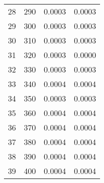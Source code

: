 \begin{table}
\begin{adjustbox}{width=1\textwidth/2}
\begin{tabular}{|c|c|c|c|}
\cline{1-4}
28 & 290 & 0.0003 & 0.0003 \\
\cline{1-4}
29 & 300 & 0.0003 & 0.0003 \\
\cline{1-4}
30 & 310 & 0.0003 & 0.0003 \\
\cline{1-4}
31 & 320 & 0.0003 & 0.0000 \\
\cline{1-4}
32 & 330 & 0.0003 & 0.0003 \\
\cline{1-4}
33 & 340 & 0.0004 & 0.0004 \\
\cline{1-4}
34 & 350 & 0.0003 & 0.0003 \\
\cline{1-4}
35 & 360 & 0.0004 & 0.0004 \\
\cline{1-4}
36 & 370 & 0.0004 & 0.0004 \\
\cline{1-4}
37 & 380 & 0.0004 & 0.0004 \\
\cline{1-4}
38 & 390 & 0.0004 & 0.0004 \\
\cline{1-4}
39 & 400 & 0.0004 & 0.0004 \\
\cline{1-4}
\end{tabular}
\end{adjustbox}
\end{table}

